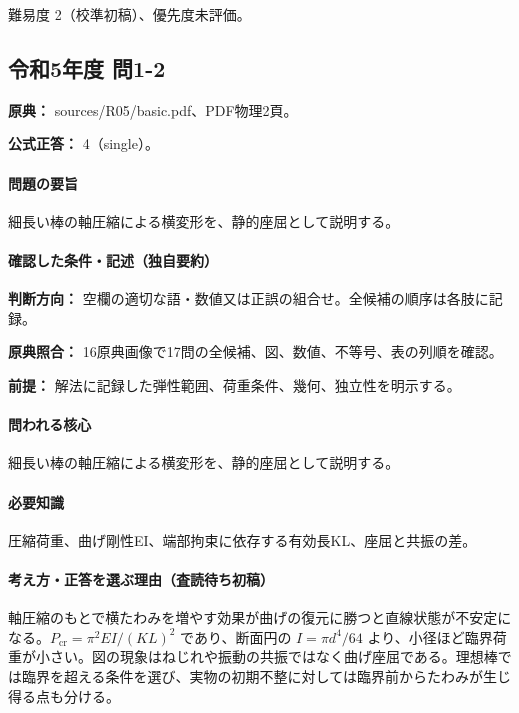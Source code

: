 \par 難易度 2（校準初稿）、優先度未評価。

\subsection{令和5年度 問1-2}
\label{q:r05-reg-basic-1-2}

\noindent\textbf{原典：} sources/R05/basic.pdf、PDF物理2頁。

\textbf{公式正答：} 4（single）。

\paragraph{問題の要旨} 細長い棒の軸圧縮による横変形を、静的座屈として説明する。

\paragraph{確認した条件・記述（独自要約）}\mbox{}\par

\noindent\textbf{判断方向：} 空欄の適切な語・数値又は正誤の組合せ。全候補の順序は各肢に記録。\par

\noindent\textbf{原典照合：} 16原典画像で17問の全候補、図、数値、不等号、表の列順を確認。\par

\noindent\textbf{前提：} 解法に記録した弾性範囲、荷重条件、幾何、独立性を明示する。\par

\paragraph{問われる核心} 細長い棒の軸圧縮による横変形を、静的座屈として説明する。

\paragraph{必要知識} 圧縮荷重、曲げ剛性EI、端部拘束に依存する有効長KL、座屈と共振の差。

\paragraph{考え方・正答を選ぶ理由（査読待ち初稿）} 軸圧縮のもとで横たわみを増やす効果が曲げの復元に勝つと直線状態が不安定になる。\(P_{\mathrm{cr}}=\pi^2EI/(KL)^2\) であり、断面円の \(I=\pi d^4/64\) より、小径ほど臨界荷重が小さい。図の現象はねじれや振動の共振ではなく曲げ座屈である。理想棒では臨界を超える条件を選び、実物の初期不整に対しては臨界前からたわみが生じ得る点も分ける。

